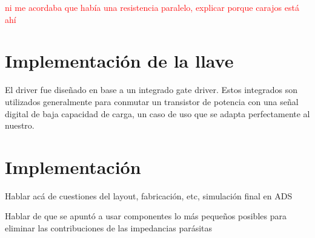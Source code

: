 \textcolor{red}{ni me acordaba que había una resistencia paralelo, explicar
porque carajos está ahí}

\section{Implementación de la llave}

El driver fue diseñado en base a un integrado gate driver. Estos integrados son
utilizados generalmente para conmutar un transistor de potencia con una señal
digital de baja capacidad de carga, un caso de uso que se adapta perfectamente
al nuestro.

\section{Implementación}

Hablar acá de cuestiones del layout, fabricación, etc, simulación final en ADS

Hablar de que se apuntó a usar componentes lo más pequeños posibles para
eliminar las contribuciones de las impedancias parásitas
